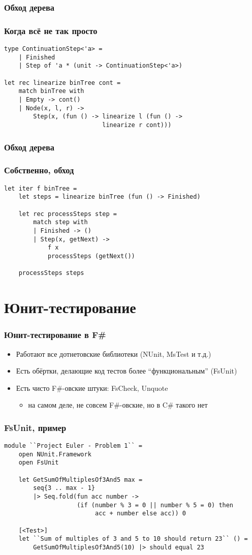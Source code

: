 \documentclass[xetex,mathserif,serif]{beamer}
\begin{document}
	\begin{frame}[fragile]
		\frametitle{Обход дерева}
		\frametitle{Когда всё не так просто}
		\begin{verbatim}
type ContinuationStep<'a> =
    | Finished
    | Step of 'a * (unit -> ContinuationStep<'a>)

let rec linearize binTree cont =
    match binTree with
    | Empty -> cont()
    | Node(x, l, r) ->
        Step(x, (fun () -> linearize l (fun () -> 
                           linearize r cont)))
		\end{verbatim}
	\end{frame}

	\begin{frame}[fragile]
		\frametitle{Обход дерева}
		\frametitle{Собственно, обход}
		\begin{verbatim}
let iter f binTree =
    let steps = linearize binTree (fun () -> Finished)

    let rec processSteps step =
        match step with
        | Finished -> ()
        | Step(x, getNext) -> 
            f x
            processSteps (getNext())
    
    processSteps steps
		\end{verbatim}
	\end{frame}

	\section{Юнит-тестирование}

	\begin{frame}
		\frametitle{Юнит-тестирование в F\#}
		\begin{itemize}
			\item Работают все дотнетовские библиотеки (NUnit, MsTest и т.д.)
			\item Есть обёртки, делающие код тестов более ``функциональным'' (FsUnit)
			\item Есть чисто F\#-овские штуки: FsCheck, Unquote 
			\begin{itemize}
				\item на самом деле, не совсем F\#-овские, но в C\# такого нет
			\end{itemize}
		\end{itemize}
	\end{frame}

	\begin{frame}[fragile]
		\frametitle{FsUnit, пример}
		\begin{verbatim}
module ``Project Euler - Problem 1`` =
    open NUnit.Framework
    open FsUnit

    let GetSumOfMultiplesOf3And5 max =
        seq{3 .. max - 1} 
        |> Seq.fold(fun acc number ->
                    (if (number % 3 = 0 || number % 5 = 0) then
                         acc + number else acc)) 0

    [<Test>]
    let ``Sum of multiples of 3 and 5 to 10 should return 23`` () =
        GetSumOfMultiplesOf3And5(10) |> should equal 23
		\end{verbatim}
	\end{frame}
\end{document}
